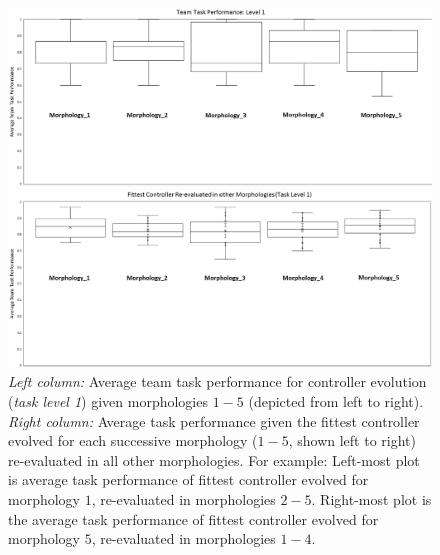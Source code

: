 \begin{figure}[t]
	\begin{minipage}{0.5\textwidth}
		\includegraphics[width=\textwidth]{Evo_BoxPlot_Level1.eps}
	\end{minipage}
	\begin{minipage}{0.5\textwidth}
		\includegraphics[width=\textwidth]{Level1_ReEval.eps}
	\end{minipage}
	\caption{\textit{Left column:} Average team task performance for controller evolution (\textit{task level 1})
		given morphologies $1-5$ (depicted from left to right).
		\textit{Right column:} Average task performance given the fittest controller evolved
		for each successive morphology ($1-5$, shown left to right) re-evaluated in all other morphologies.
		For example: Left-most plot is average task performance of fittest controller evolved for
		morphology $1$, re-evaluated in morphologies $2-5$.  Right-most plot is the average task performance
		of fittest controller evolved for morphology $5$, re-evaluated in morphologies $1-4$.}\label{fig:level1results}
\end{figure}

